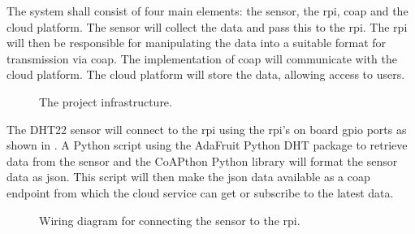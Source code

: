The system shall consist of four main elements: the sensor, the \gls{rpi}, \gls{coap} and the cloud platform.
The sensor will collect the data and pass this to the \gls{rpi}. The \gls{rpi} will then be responsible for manipulating
the data into a suitable format for transmission via \gls{coap}. The implementation of \gls{coap} will communicate with
the cloud platform. The cloud platform will store the data, allowing access to users.

\begin{figure}[H]
    \centering
    \caption{\label{fig:proj_framework} The project infrastructure.}
\end{figure}

The DHT22 sensor will connect to the \gls{rpi} using the \gls{rpi}'s on board \gls{gpio} ports as shown in . 
A Python script using the AdaFruit Python DHT package to retrieve data from the sensor and the CoAPthon Python library will format the sensor data as 
\gls{json}. This script will then make the \gls{json} data available as a \gls{coap} endpoint from which the cloud service can get or subscribe to 
the latest data. 


\begin{figure}[H]
    \centering
    \caption{\label{fig:rpi_wiring} Wiring diagram for connecting the sensor to the \gls{rpi}.}
\end{figure}


